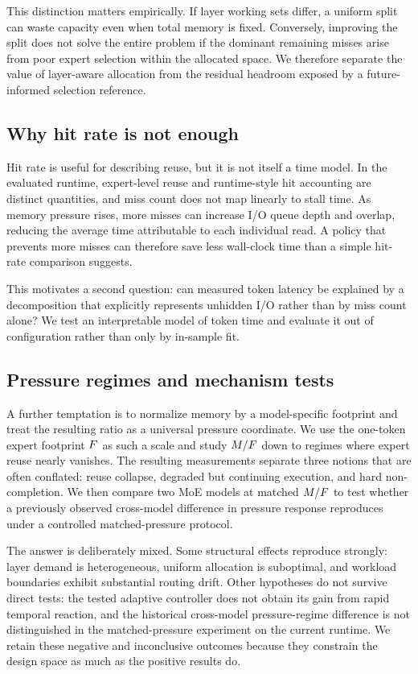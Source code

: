 This distinction matters empirically. If layer working sets differ, a uniform split can waste capacity even when total memory is fixed. Conversely, improving the split does not solve the entire problem if the dominant remaining misses arise from poor expert selection within the allocated space. We therefore separate the value of layer-aware allocation from the residual headroom exposed by a future-informed selection reference.

\subsection{Why hit rate is not enough}

Hit rate is useful for describing reuse, but it is not itself a time model. In the evaluated runtime, expert-level reuse and runtime-style hit accounting are distinct quantities, and miss count does not map linearly to stall time. As memory pressure rises, more misses can increase I/O queue depth and overlap, reducing the average time attributable to each individual read. A policy that prevents more misses can therefore save less wall-clock time than a simple hit-rate comparison suggests.

This motivates a second question: can measured token latency be explained by a decomposition that explicitly represents unhidden I/O rather than by miss count alone? We test an interpretable model of token time and evaluate it out of configuration rather than only by in-sample fit.

\subsection{Pressure regimes and mechanism tests}

A further temptation is to normalize memory by a model-specific footprint and treat the resulting ratio as a universal pressure coordinate. We use the one-token expert footprint $F$ as such a scale and study $M/F$ down to regimes where expert reuse nearly vanishes. The resulting measurements separate three notions that are often conflated: reuse collapse, degraded but continuing execution, and hard non-completion. We then compare two MoE models at matched $M/F$ to test whether a previously observed cross-model difference in pressure response reproduces under a controlled matched-pressure protocol.

The answer is deliberately mixed. Some structural effects reproduce strongly: layer demand is heterogeneous, uniform allocation is suboptimal, and workload boundaries exhibit substantial routing drift. Other hypotheses do not survive direct tests: the tested adaptive controller does not obtain its gain from rapid temporal reaction, and the historical cross-model pressure-regime difference is not distinguished in the matched-pressure experiment on the current runtime. We retain these negative and inconclusive outcomes because they constrain the design space as much as the positive results do.

